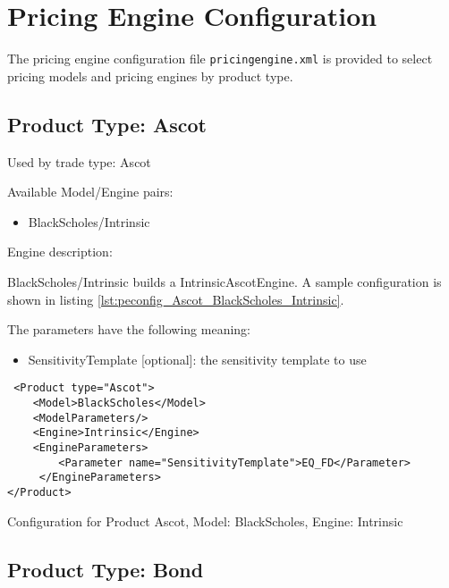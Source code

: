 \section{Pricing Engine Configuration}
\label{sec:configuration_pricingengines}

The pricing engine configuration file {\tt pricingengine.xml} is provided to select pricing models and
pricing engines by product type.

\subsection{Product Type: Ascot}

Used by trade type: Ascot

Available Model/Engine pairs:

\begin{itemize}
\item BlackScholes/Intrinsic
\end{itemize}

Engine description:

BlackScholes/Intrinsic builds a IntrinsicAscotEngine. A sample configuration is shown
in listing \ref{lst:peconfig_Ascot_BlackScholes_Intrinsic}.

The parameters have the following meaning:

\begin{itemize}
\item SensitivityTemplate [optional]: the sensitivity template to use 
\end{itemize}

\begin{longlisting}
\begin{verbatim}
 <Product type="Ascot">
    <Model>BlackScholes</Model>
    <ModelParameters/>
    <Engine>Intrinsic</Engine>
    <EngineParameters>
        <Parameter name="SensitivityTemplate">EQ_FD</Parameter>
     </EngineParameters>
</Product>
\end{verbatim}
\caption{Configuration for Product Ascot, Model: BlackScholes, Engine: Intrinsic}
\label{lst:peconfig_Ascot_BlackScholes_Intrinsic}
\end{longlisting}

\subsection{Product Type: Bond}

